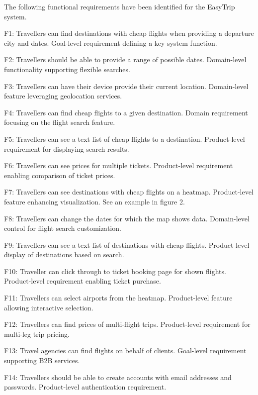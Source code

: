 The following functional requirements have been identified for the EasyTrip system.

F1: Travellers can find destinations with cheap flights when providing a departure city and dates.
    Goal-level requirement defining a key system function.
    
F2: Travellers should be able to provide a range of possible dates.
    Domain-level functionality supporting flexible searches.
    
F3: Travellers can have their device provide their current location.
    Domain-level feature leveraging geolocation services.
    
F4: Travellers can find cheap flights to a given destination.
    Domain requirement focusing on the flight search feature.
    
F5: Travellers can see a text list of cheap flights to a destination.
    Product-level requirement for displaying search results.
    
F6: Travellers can see prices for multiple tickets.
    Product-level requirement enabling comparison of ticket prices.

F7: Travellers can see destinations with cheap flights on a heatmap.
    Product-level feature enhancing visualization. See an example in figure 2.

F8: Travellers can change the dates for which the map shows data.
    Domain-level control for flight search customization.

F9: Travellers can see a text list of destinations with cheap flights.
    Product-level display of destinations based on search.

F10: Traveller can click through to ticket booking page for shown flights.
    Product-level requirement enabling ticket purchase.

F11: Travellers can select airports from the heatmap.
    Product-level feature allowing interactive selection.

F12: Travellers can find prices of multi-flight trips.
    Product-level requirement for multi-leg trip pricing.

F13: Travel agencies can find flights on behalf of clients.
    Goal-level requirement supporting B2B services.

F14: Travellers should be able to create accounts with email addresses and passwords.
    Product-level authentication requirement.

